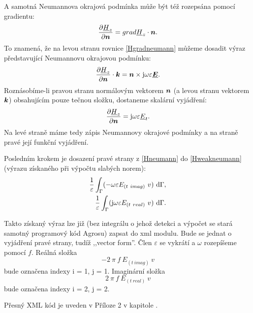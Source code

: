 \documentclass[12pt,a4paper,oneside]{article}
\numberwithin{equation}{section} %
\numberwithin{figure}{section} %
\numberwithin{table}{section} %
\newcommand{\mj}{\mathrm{j}} %
\renewcommand{\vec}[1]{\mbox{\boldmath$#1$}} %
\newcommand{\faz}[1]{{\underline{#1}}} %
\begin{document}
A samotná Neumannova okrajová podmínka může být též rozepsána pomocí gradientu:
\begin{equation}
\label{Hgradneumann}
\frac{\partial \faz{H}_z}{\partial \vec{n}} = grad \faz{H}_z \cdot \vec{n} .
\end{equation}
To znamená, že na levou stranu rovnice \ref{Hgradneumann} můžeme dosadit výraz představující Neumannovu okrajovou podmínku:
\begin{equation}
\frac{\partial \faz{H}_z}{\partial \vec{n}} \cdot \vec{k} = \vec{n} \times \mj \omega \varepsilon \faz{\vec{E}}.
\end{equation}
Roznásobíme-li pravou stranu normálovým vektorem $\vec{n}$ (a levou stranu vektorem $\vec{k}$) obsahujícím pouze tečnou složku, dostaneme skalární vyjádření:
\begin{equation}
\label{Hneumann}
\frac{\partial \faz{H}_z}{\partial \vec{n}} = \mj \omega \varepsilon \faz{E}_t .
\end{equation}
Na levé straně máme tedy zápis Neumannovy okrajové podmínky a na straně pravé její funkční vyjádření.

Posledním krokem je dosazení pravé strany z \ref{Hneumann} do \ref{Hweakneumann} (výrazu získaného při výpočtu slabých norem):
\begin{subequations}
\begin{align}
\frac{1}{\varepsilon} \int _{\Gamma} (- \omega \varepsilon E_{(t~imag)} ~ v ) ~ \ud \Gamma ,
\\ 
\frac{1}{\varepsilon} \int _{\Gamma} (\mj \omega \varepsilon E_{(t~real)} ~ v ) ~ \ud \Gamma .
\end{align}
\end{subequations}

Takto získaný výraz lze již (bez integrálu o jehož detekci a výpočet se stará samotný programový kód Agrosu) zapsat do xml modulu. Bude se jednat o vyjádření pravé strany, tudíž ,,vector form''. Člen $\varepsilon$ se vykrátí a $\omega$ rozepíšeme pomocí $f$. Reálná složka  
\begin{equation}
- 2 ~ \pi ~ f ~ E_{(t~imag)} ~ v
\end{equation} 
bude označena indexy i = 1, j = 1. Imaginární složka 
\begin{equation}
2 ~ \pi ~ f ~ E_{(t~real)} ~ v
\end{equation}
bude označena indexy i = 2, j = 2.

Přesný XML kód je uveden v Příloze 2 v kapitole .
\end{document}
